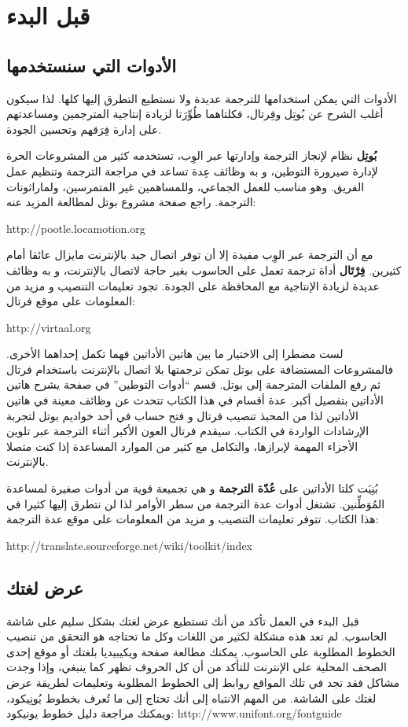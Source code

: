 \chapter{قبل البدء}
\section[ref:20165030]{الأدوات التي سنستخدمها}
الأدوات التي يمكن استخدامها
للترجمة عديدة ولا نستطيع التطرق إليها كلها. لذا سيكون أغلب الشرح عن
بُوتِل وفِرتال، فكلتاهما طُوِّرَتا لزيادة إنتاجية المترجمين ومساعدتهم
على إدارة فِرَقهم وتحسين الجودة.

{\bf بُوتِل} نظام لإنجاز الترجمة وإدارتها عبر الوِب، تستخدمه كثير من
المشروعات الحرة لإدارة صيرورة التوطين، و به وظائف عِدة تساعد في مراجعة
الترجمة وتنظيم عمل الفريق. وهو مناسب للعمل الجماعي، وللمساهمين غير
المتمرسين، ولماراثونات الترجمة. راجع صفحة مشروع بوتل لمطالعة المزيد
عنه:

http://pootle.locamotion.org

مع أن الترجمة عبر الوِب مفيدة إلا أن توفر اتصال جيد بالإنترنت مايزال
عائقا أمام كثيرين. {\bf فِرْتَال} أداة ترجمة تعمل على الحاسوب بغير حاجة
لاتصال بالإنترنت، و به وظائف عديدة لزيادة الإنتاجية مع المحافظة على
الجودة. تجود تعليمات التنصيب و مزيد من المعلومات على موقع فرتال:

http://virtaal.org

لست مضطرا إلى الاختيار ما بين هاتين الأداتين فهما تكمل إحداهما الأخرى.
فالمشروعات المستضافة على بوتل تمكن ترجمتها بلا اتصال بالإنترنت باستخدام
فرتال ثم رفع الملفات المترجمة إلى بوتل. قسم “أدوات التوطين” في صفحة
\at[ref:30364807] يشرح هاتين الأداتين بتفصيل أكبر. عدة أقسام
في هذا الكتاب تتحدث عن وظائف معينة في هاتين الأداتين لذا من المحبذ
تنصيب فرتال و فتح حساب في أحد خواديم بوتل لتجربة الإرشادات الواردة في
الكتاب. سيقدم فرتال العون الأكبر أثناء الترجمة عبر تلوين الأجزاء المهمة
لإبرازها، والتكامل مع كثير من الموارد المساعدة إذا كنت متصلا بالإنترنت.

بُنِيَت كلتا الأداتين على {\bf عُدّة الترجمة} و هي تجميعة قوية من أدوات
صغيرة لمساعدة المُوَطِّنين. تشتغل أدوات عدة الترجمة من سطر الأوامر لذا
لن نتطرق إليها كثيرا في هذا الكتاب. تتوفر تعليمات التنصيب و مزيد من
المعلومات على موقع عدة الترجمة:

http://translate.sourceforge.net/wiki/toolkit/index

\section{عرض لغتك}
قبل البدء في العمل تأكد من أنك تستطيع عرض لغتك بشكل سليم على شاشة
الحاسوب. لم تعد هذه مشكلة لكثير من اللغات وكل ما تحتاجه هو التحقق من
تنصيب الخطوط المطلوبة على الحاسوب. يمكنك مطالعة صفحة ويكيبيديا بلغتك أو
موقع إحدى الصحف المحلية على الإنترنت للتأكد من أن كل الحروف تظهر كما
ينبغي، وإذا وجدت مشاكل فقد تجد في تلك المواقع روابط إلى الخطوط المطلوبة
وتعليمات لطريقة عرض لغتك على الشاشة. من المهم الانتباه إلى أنك تحتاج
إلى ما تُعرف بخطوط يُونِيكود، ويمكنك مراجعة دليل خطوط يونيكود:
http://www.unifont.org/fontguide

